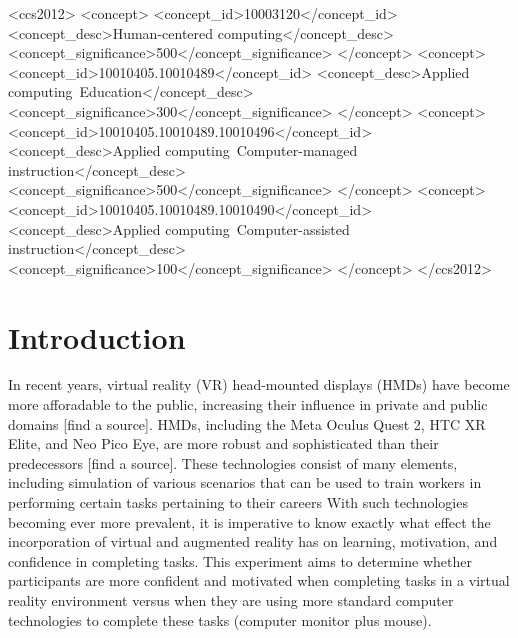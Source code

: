 \documentclass[manuscript,screen,review]{acmart}
\begin{document}
\begin{CCSXML}
<ccs2012>
   <concept>
       <concept_id>10003120</concept_id>
       <concept_desc>Human-centered computing</concept_desc>
       <concept_significance>500</concept_significance>
       </concept>
   <concept>
       <concept_id>10010405.10010489</concept_id>
       <concept_desc>Applied computing~Education</concept_desc>
       <concept_significance>300</concept_significance>
       </concept>
   <concept>
       <concept_id>10010405.10010489.10010496</concept_id>
       <concept_desc>Applied computing~Computer-managed instruction</concept_desc>
       <concept_significance>500</concept_significance>
       </concept>
   <concept>
       <concept_id>10010405.10010489.10010490</concept_id>
       <concept_desc>Applied computing~Computer-assisted instruction</concept_desc>
       <concept_significance>100</concept_significance>
       </concept>
 </ccs2012>
\end{CCSXML}




\maketitle

\section{Introduction}
In recent years, virtual reality (VR) head-mounted displays (HMDs) have become more afforadable to the public, increasing their influence in private and public domains [find a source]. HMDs, including the Meta Oculus Quest 2, HTC XR Elite, and Neo Pico Eye, are more robust and sophisticated than their predecessors [find a source]. These technologies consist of many elements, including simulation of various scenarios that can be used to train workers in performing certain tasks pertaining to their careers \cite{zheng1998virtual} With such technologies becoming ever more prevalent, it is imperative to know exactly what effect the incorporation of virtual and augmented reality has on learning, motivation, and confidence in completing tasks. This experiment aims to determine whether participants are more confident and motivated when completing tasks in a virtual reality environment versus when they are using more standard computer technologies to complete these tasks (computer monitor plus mouse).
\end{document}
